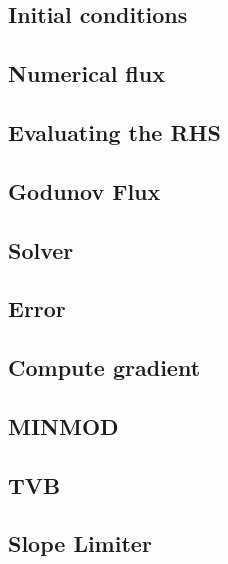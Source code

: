 \documentclass[11pt,a4paper]{article}
\begin{document}
\subsection{Initial conditions}\label{IC}


\subsection{Numerical flux}\label{flux}


\subsection{Evaluating the RHS}\label{rhs}


\subsection{Godunov Flux}\label{G_flux}


\subsection{Solver}\label{solver}


\subsection{Error}\label{error}


\subsection{Compute gradient}\label{gradient}


\subsection{MINMOD}\label{minmod}


\subsection{TVB}\label{tvb}


\subsection{Slope Limiter}\label{slope}

\end{document}
